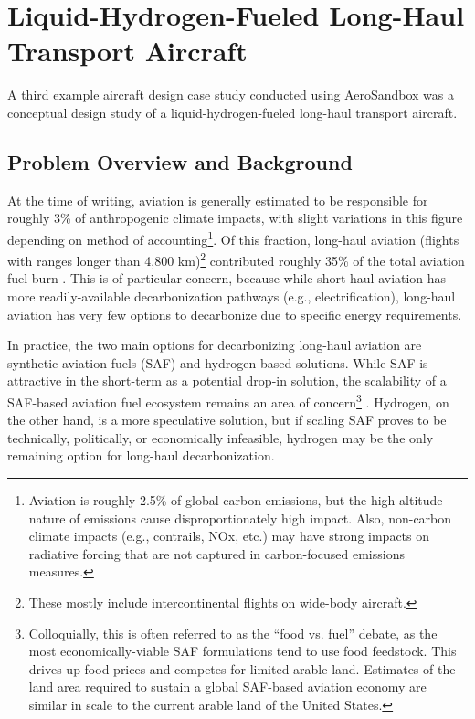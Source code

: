 \section{Liquid-Hydrogen-Fueled Long-Haul Transport Aircraft}
\label{sec:hydrogen}

A third example aircraft design case study conducted using AeroSandbox was a conceptual design study of a liquid-hydrogen-fueled long-haul transport aircraft.

\subsection{Problem Overview and Background}

At the time of writing, aviation is generally estimated to be responsible for roughly 3\% of anthropogenic climate impacts, with slight variations in this figure depending on method of accounting\footnote{Aviation is roughly 2.5\% of global carbon emissions, but the high-altitude nature of emissions cause disproportionately high impact. Also, non-carbon climate impacts (e.g., contrails, NOx, etc.) may have strong impacts on radiative forcing that are not captured in carbon-focused emissions measures.}. Of this fraction, long-haul aviation (flights with ranges longer than 4,800 km)\footnote{These mostly include intercontinental flights on wide-body aircraft.} contributed roughly 35\% of the total aviation fuel burn \cite{yutko}. This is of particular concern, because while short-haul aviation has more readily-available decarbonization pathways (e.g., electrification), long-haul aviation has very few options to decarbonize due to specific energy requirements.

In practice, the two main options for decarbonizing long-haul aviation are synthetic aviation fuels (SAF) and hydrogen-based solutions. While SAF is attractive in the short-term as a potential drop-in solution, the scalability of a SAF-based aviation fuel ecosystem remains an area of concern\footnote{Colloquially, this is often referred to as the ``food vs. fuel'' debate, as the most economically-viable SAF formulations tend to use food feedstock. This drives up food prices and competes for limited arable land. Estimates of the land area required to sustain a global SAF-based aviation economy are similar in scale to the current arable land of the United States.} \cite{waypoint2050, gaubatz_estimating_2023}. Hydrogen, on the other hand, is a more speculative solution, but if scaling SAF proves to be technically, politically, or economically infeasible, hydrogen may be the only remaining option for long-haul decarbonization.

